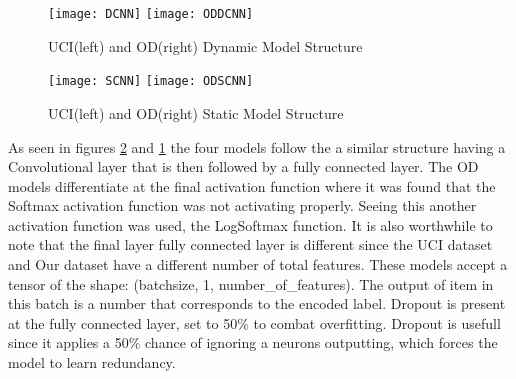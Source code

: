         \begin{figure}[h]
        \centering
        \texttt{[image: DCNN]}\hfill
        \texttt{[image: ODDCNN]}\hfill
        \caption{UCI(left) and OD(right) Dynamic Model Structure}
        \label{Dynamic_Models}
        \end{figure}

        \begin{figure}[h]
        \centering
        \texttt{[image: SCNN]}\hfill
        \texttt{[image: ODSCNN]}\hfill
        \caption{UCI(left) and OD(right) Static Model Structure}
        \label{Static_Models}
        \end{figure}

        As seen in figures \ref{Static_Models} and \ref{Dynamic_Models} the four models follow the a similar structure having a Convolutional layer that is then followed by a fully connected layer.
        The OD models differentiate at the final activation function where it was found that the Softmax activation function was not activating properly.
        Seeing this another activation function was used, the LogSoftmax function.
        It is also worthwhile to note that the final layer fully connected layer is different since the UCI dataset and Our dataset have a different number of total features.
        These models accept a tensor of the shape: (batchsize, 1, number\_of\_features).
        The output of item in this batch is a number that corresponds to the encoded label.
        Dropout is present at the fully connected layer, set to 50\% to combat overfitting.
        Dropout is usefull since it applies a 50\% chance of ignoring a neurons outputting, which forces the model to learn redundancy.